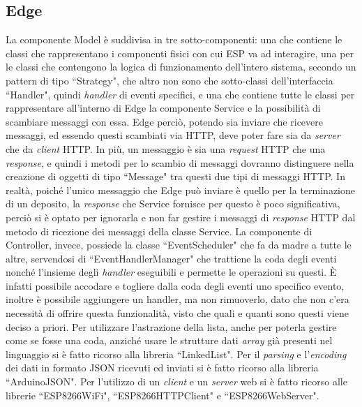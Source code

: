 \documentclass[a4paper, 12pt]{report}
\begin{document}
			\subsection{Edge}
			La componente Model è suddivisa in tre sotto-componenti: una che contiene le classi che
			rappresentano i componenti fisici con cui ESP va ad interagire, una per le classi che
			contengono la logica di funzionamento dell'intero sistema, secondo un pattern di tipo
			``Strategy", che altro non sono che sotto-classi dell'interfaccia ``Handler", quindi 
			\textit{handler} di eventi specifici, e una che contiene tutte le classi per rappresentare
			all'interno di Edge la componente Service e la possibilità di scambiare messaggi con essa.
			Edge perciò, potendo sia inviare che ricevere messaggi, ed essendo questi scambiati via
			HTTP, deve poter fare sia da \textit{server} che da \textit{client} HTTP. In più, un
			messaggio è sia una \textit{request} HTTP che una \textit{response}, e quindi i metodi per lo
			scambio di messaggi dovranno distinguere nella creazione di oggetti di tipo ``Message" tra
			questi due tipi di messaggi HTTP. In realtà, poiché l'unico messaggio che Edge può inviare
			è quello per la terminazione di un deposito, la \textit{response} che Service fornisce per
			questo è poco significativa, perciò si è optato per ignorarla e non far gestire i
			messaggi di \textit{response} HTTP dal metodo di ricezione dei messaggi della classe Service.\newline 
			La componente di Controller, invece, possiede la classe ``EventScheduler" che fa da madre a tutte le
			altre, servendosi di ``EventHandlerManager" che trattiene la
			coda degli eventi nonché l'insieme degli \textit{handler} eseguibili e permette le operazioni
			su questi. È infatti possibile accodare e togliere dalla coda degli eventi uno specifico
			evento, inoltre è possibile aggiungere un handler, ma non rimuoverlo, dato che non c'era
			necessità di offrire questa funzionalità, visto che quali e quanti sono questi viene deciso
			a priori.\newline
			Per utilizzare l'astrazione della lista, anche per poterla gestire come se fosse una coda,
			anziché usare le strutture dati \textit{array} già presenti nel linguaggio si è fatto
			ricorso alla libreria ``LinkedList". Per il \textit{parsing} e l'\textit{encoding} dei dati in formato
			JSON ricevuti ed inviati si è fatto ricorso alla libreria ``ArduinoJSON". Per l'utilizzo di
			un \textit{client} e un \textit{server} web si è fatto ricorso alle
			librerie ``ESP8266WiFi", ``ESP8266HTTPClient" e ``ESP8266WebServer".
\end{document}
